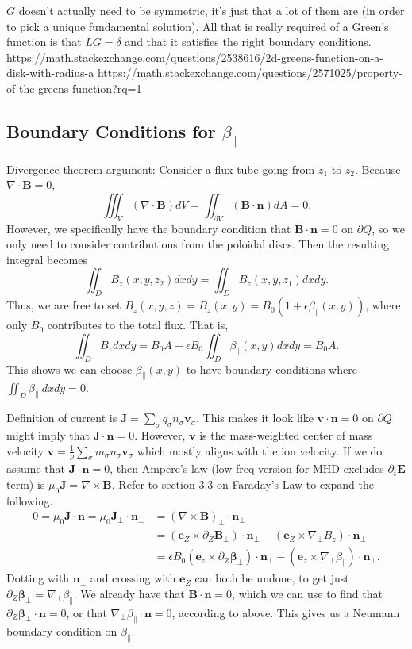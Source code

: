 \documentclass{article}
\newcommand{\para}{\parallel}
\newcommand{\ep}{\epsilon}
\newcommand{\np}{\nabla_\perp}
\newcommand{\p}{\partial}
\newcommand{\pth} [1] {\left( #1 \right) }
\begin{document}
$G$ doesn't actually need to be symmetric, it's just that a lot of them are (in order to pick a unique fundamental solution). All that is really required of a Green's function is that $LG=\delta$ and that it satisfies the right boundary conditions. 
https://math.stackexchange.com/questions/2538616/2d-greens-function-on-a-disk-with-radius-a
https://math.stackexchange.com/questions/2571025/property-of-the-greens-function?rq=1 


\subsection{Boundary Conditions for $\beta_\para$}
Divergence theorem argument: Consider a flux tube going from $z_1$ to $z_2$. Because $\nabla\cdot\bm{B}=0$,  
$$\iiint_V \pth{\nabla\cdot \bm{B}} dV = \iint_{\p V} \pth{\bm{B}\cdot \bm{n}} dA = 0.$$
However, we specifically have the boundary condition that $\bm{B}\cdot\bm{n}=0$ on $\p Q$, so we only need to consider contributions from the poloidal discs. Then the resulting integral becomes 
$$\iint_D B_z(x,y,z_2)dxdy = \iint_D B_z(x,y,z_1) dxdy.$$
Thus, we are free to set $B_z(x,y,z) = B_z(x,y) = B_0 \pth{1 + \ep\beta_\para(x,y)}$, where only $B_0$ contributes to the total flux. That is,  
$$\iint_D B_zdxdy = B_0A + \ep B_0\iint_D \beta_\para(x,y)dxdy = B_0A.$$
This shows we can choose $\beta_\para(x,y)$ to have boundary conditions where $\iint_D \beta_\para\ dxdy = 0$.  

Definition of current is $\bm{J} = \sum_\sigma q_\sigma n_\sigma \bm{v}_\sigma$. This makes it look like $\bm{v}\cdot\bm{n}=0$ on $\p Q$ might imply that $\bm{J}\cdot\bm{n}=0$. However, $\bm{v}$ is the mass-weighted center of mass velocity $\bm{v}= \frac{1}{\rho} \sum_\sigma m_\sigma n_\sigma \bm{v}_\sigma$ which mostly aligns with the ion velocity. If we do assume that $\bm{J}\cdot\bm{n}=0$, then Ampere's law (low-freq version for MHD excludes $\p_t \bm{E}$ term) is $\mu_0 \bm{J} = \nabla\times\bm{B}$. Refer to section 3.3 on Faraday's Law to expand the following.  
\begin{align*}
    0= \mu_0\bm{J}\cdot\bm{n} = \mu_0 \bm{J}_\perp\cdot\bm{n}_\perp &= \pth{\nabla\times\bm{B}}_\perp \cdot\bm{n}_\perp \\ 
    &= \pth{\bm{e}_Z\times\p_Z\bm{B}_\perp} \cdot\bm{n}_\perp - \pth{\bm{e}_Z\times\np B_z}\cdot\bm{n}_\perp \\ 
    &= \ep B_0 \pth{\bm{e}_z\times\p_Z\bm{\beta}_\perp} \cdot\bm{n}_\perp - \pth{\bm{e}_z\times\np\beta_\para} \cdot\bm{n}_\perp. 
\end{align*}
Dotting with $\bm{n}_\perp$ and crossing with $\bm{e}_Z$ can both be undone, to get just $\p_Z\bm{\beta}_\perp = \np\beta_\para$. We already have that $\bm{B}\cdot\bm{n}=0$, which we can use to find that $\p_Z\bm{\beta}_\perp\cdot\bm{n}=0$, or that $\np\beta_\para\cdot\bm{n}=0$, according to above. This gives us a Neumann boundary condition on $\beta_\para$. 
\end{document}
